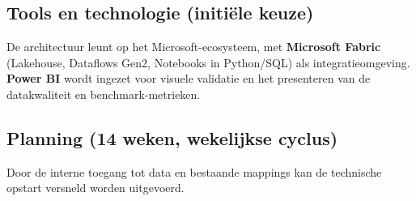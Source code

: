 \subsection{Tools en technologie (initiële keuze)}
De architectuur leunt op het Microsoft-ecosysteem, met \textbf{Microsoft Fabric} (Lakehouse, Dataflows Gen2, Notebooks in Python/SQL) als integratieomgeving. \textbf{Power BI} wordt ingezet voor visuele validatie en het presenteren van de datakwaliteit en benchmark-metrieken.

\subsection{Planning (14 weken, wekelijkse cyclus)}
Door de interne toegang tot data en bestaande mappings kan de technische opstart versneld worden uitgevoerd.

